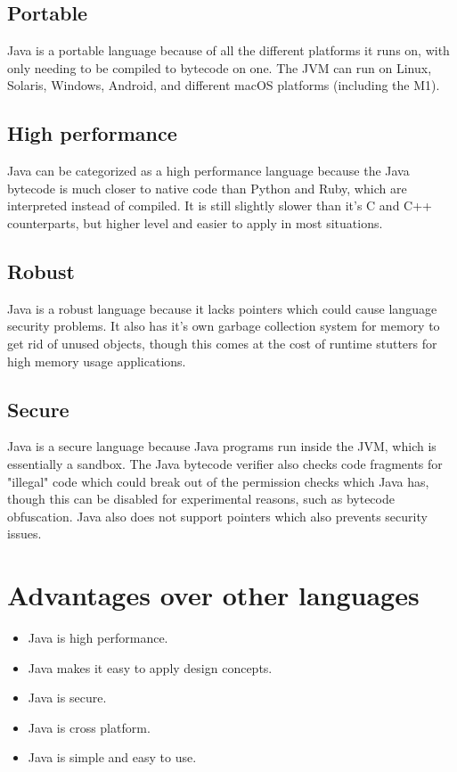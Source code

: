 \documentclass{article}
\begin{document}
  \subsection{Portable}
  Java is a portable language because of all the different platforms it runs on, with only needing to be compiled to bytecode on one.
  The JVM can run on Linux, Solaris, Windows, Android, and different macOS platforms (including the M1).

  \subsection{High performance}
  Java can be categorized as a high performance language because the Java bytecode is much closer to native code than Python and Ruby, which are interpreted instead of compiled.
  It is still slightly slower than it's C and C++ counterparts, but higher level and easier to apply in most situations.

  \subsection{Robust}
  Java is a robust language because it lacks pointers which could cause language security problems.
  It also has it's own garbage collection system for memory to get rid of unused objects, though this comes at the cost of runtime stutters for high memory usage applications.

  \subsection{Secure}
  Java is a secure language because Java programs run inside the JVM, which is essentially a sandbox.
  The Java bytecode verifier also checks code fragments for "illegal" code which could break out of the permission checks which Java has, though this can be disabled for experimental reasons, such as bytecode obfuscation.
  Java also does not support pointers which also prevents security issues.

  \section{Advantages over other languages}
  \begin{itemize}
    \item Java is high performance.
    \item Java makes it easy to apply design concepts.
    \item Java is secure.
    \item Java is cross platform.
    \item Java is simple and easy to use.
  \end{itemize}
\end{document}
